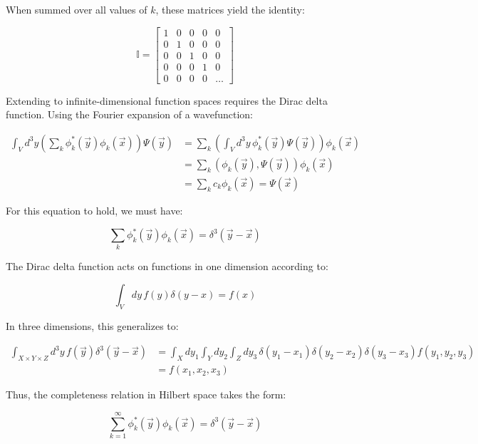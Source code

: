 \documentclass[italian]{HKNdocument}
\begin{document}
When summed over all values of $k$, these matrices yield the identity:

\[
\mathbb{I} = \begin{bmatrix}
1 & 0 & 0 & 0 & 0 \\
0 & 1 & 0 & 0 & 0 \\
0 & 0 & 1 & 0 & 0 \\
0 & 0 & 0 & 1 & 0 \\
0 & 0 & 0 & 0 & \ldots
\end{bmatrix}
\]

Extending to infinite-dimensional function spaces requires the Dirac delta function. Using the Fourier expansion of a wavefunction:

\begin{align}
\int_V d^3y \left(\sum_k \phi_k^*(\vec{y})\phi_k(\vec{x})\right)\Psi(\vec{y}) &= \sum_k \left(\int_V d^3y\, \phi_k^*(\vec{y})\Psi(\vec{y})\right)\phi_k(\vec{x}) \\
&= \sum_k (\phi_k(\vec{y}), \Psi(\vec{y}))\phi_k(\vec{x}) \\
&= \sum_k c_k\phi_k(\vec{x}) = \Psi(\vec{x})
\end{align}

For this equation to hold, we must have:

\begin{equation}
\sum_k \phi_k^*(\vec{y})\phi_k(\vec{x}) = \delta^3(\vec{y}-\vec{x})
\end{equation}

The Dirac delta function acts on functions in one dimension according to:

\begin{equation}
\int_V dy\, f(y)\delta(y-x) = f(x)
\end{equation}

In three dimensions, this generalizes to:

\begin{align}
\int_{X \times Y \times Z} d^3y\, f(\vec{y})\delta^3(\vec{y}-\vec{x}) &= \int_X dy_1 \int_Y dy_2 \int_Z dy_3\, \delta(y_1-x_1)\delta(y_2-x_2)\delta(y_3-x_3)f(y_1,y_2,y_3) \\
&= f(x_1,x_2,x_3)
\end{align}

Thus, the completeness relation in Hilbert space takes the form:

\begin{equation}
\sum_{k=1}^{\infty} \phi_k^*(\vec{y})\phi_k(\vec{x}) = \delta^3(\vec{y}-\vec{x})
\end{equation}
\end{document}
